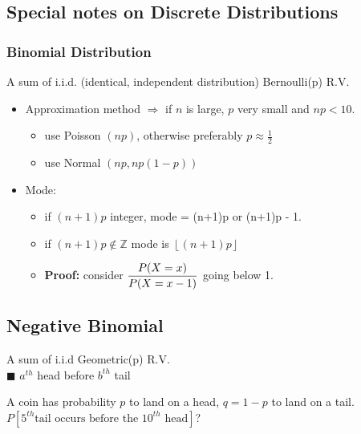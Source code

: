 \subsection*{Special notes on Discrete Distributions}
\subsubsection*{Binomial Distribution}
A sum of i.i.d. (identical, independent distribution) Bernoulli(p) R.V.
\begin{itemize}
	\item Approximation method $\Rightarrow$ if $n$ is large, $p$ very small and $np < 10$.
	\begin{itemize}[label={--}]
		\item use Poisson $(np)$, otherwise preferably $p \approx \frac{1}{2}$
		\item use Normal $(np, np(1-p))$
	\end{itemize}
	\item Mode: 
	\begin{itemize}[label={--}]
		\item if $(n+1)p$ integer, mode = (n+1)p or (n+1)p - 1.
		\item if $(n+1)p \notin \mathbb{Z}$ mode is $\left \lfloor{(n+1)p}\right \rfloor$
		\item \textbf{Proof:} consider $\mathlarger{\frac{P(X=x)}{P(X=x-1)}}$ going below 1.
	\end{itemize}
\end{itemize}
\subsection*{Negative Binomial}
A sum of i.i.d Geometric(p) R.V.\\
$\blacksquare$ $a^{th}$ head before $b^{th}$ tail
\begin{example-N}
	A coin has probability $p$ to land on a head, $q = 1-p$ to land on a tail.\\
	$P[5^{th} \text{tail occurs before the } 10^{th} \text{ head}]$?
\end{example-N}